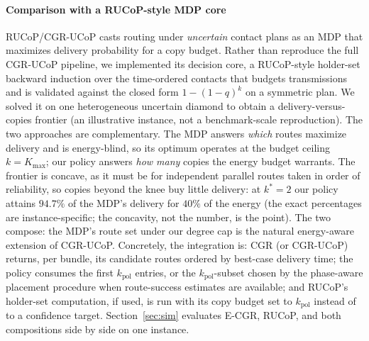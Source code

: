 \documentclass[twocolumn,3p,times,procedia]{elsarticle}
\theoremstyle{plain}
\theoremstyle{remark}
\begin{document}
\paragraph*{Comparison with a RUCoP-style MDP core}
RUCoP/CGR-UCoP casts routing under \emph{uncertain} contact plans as an
MDP that maximizes delivery probability for a copy budget. Rather than
reproduce the full CGR-UCoP pipeline, we implemented its decision core,
a RUCoP-style holder-set backward induction over the time-ordered
contacts that budgets transmissions and is validated against the closed
form $1-(1-q)^k$ on a symmetric plan. We solved it on one heterogeneous
uncertain diamond to obtain a delivery-versus-copies frontier (an
illustrative instance, not a benchmark-scale reproduction). The two
approaches are complementary. The MDP answers \emph{which} routes
maximize delivery and is energy-blind, so its optimum operates at the
budget ceiling $k{=}K_{\max}$; our policy answers \emph{how many}
copies the energy budget warrants. The frontier is concave, as it must be for
independent parallel routes taken in order of reliability, so copies
beyond the knee buy little delivery: at $k^\ast{=}2$ our policy
attains $94.7\%$ of the MDP's delivery for $40\%$ of the energy (the exact
percentages are instance-specific; the concavity, not the number, is the
point). The two compose: the MDP's route set under our degree cap is
the natural energy-aware extension of CGR-UCoP. Concretely, the
integration is: CGR (or CGR-UCoP) returns, per bundle, its candidate
routes ordered by best-case delivery time; the policy consumes the
first $k_{\mathrm{pol}}$ entries, or the $k_{\mathrm{pol}}$-subset chosen
by the phase-aware placement procedure when route-success estimates are
available; and RUCoP's holder-set computation, if used, is run with its
copy budget set to $k_{\mathrm{pol}}$ instead of to a confidence target.
Section~\ref{sec:sim} evaluates E-CGR, RUCoP, and both compositions
side by side on one instance.
\end{document}
